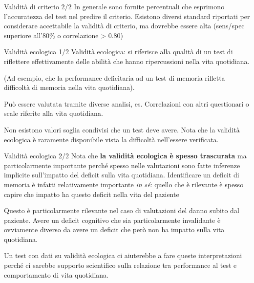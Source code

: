 \documentclass[
  ignorenonframetext,
]{beamer}
\begin{document}
\begin{frame}{Validità di criterio 2/2}
\label{validituxe0-di-criterio-22}
In generale sono fornite percentuali che esprimono l'accuratezza del
test nel predire il criterio. Esistono diversi standard riportati per
considerare accettabile la validità di criterio, ma dovrebbe essere alta
(sens/spec superiore all'80\% o correlazione \textgreater{} 0.80)
\end{frame}

\begin{frame}{Validità ecologica 1/2}
\label{validituxe0-ecologica-12}
Validità ecologica: si riferisce alla qualità di un test di riflettere
effettivamente delle abilità che hanno ripercussioni nella vita
quotidiana.

(Ad esempio, che la performance deficitaria ad un test di memoria
rifletta difficoltà di memoria nella vita quotidiana).

Può essere valutata tramite diverse analisi, es. Correlazioni con altri
questionari o scale riferite alla vita quotidiana.

Non esistono valori soglia condivisi che un test deve avere. Nota che la
validità ecologica è raramente disponibile vista la difficoltà
nell'essere verificata.
\end{frame}

\begin{frame}{Validità ecologica 2/2}
\label{validituxe0-ecologica-22}
Nota che \textbf{la validità ecologica è spesso trascurata} ma
particolarmente importante perché spesso nelle valutazioni sono fatte
inferenze implicite sull'impatto del deficit sulla vita quotidiana.
Identificare un deficit di memoria è infatti relativamente importante
\emph{in sé}: quello che è rilevante è spesso capire che impatto ha
questo deficit nella vita del paziente

Questo è particolarmente rilevante nel caso di valutazioni del danno
subito dal paziente. Avere un deficit cognitivo che sia particolarmente
invalidante è ovviamente diverso da avere un deficit che però non ha
impatto sulla vita quotidiana.

Un test con dati su validità ecologica ci aiuterebbe a fare queste
interpretazioni perché ci sarebbe supporto scientifico sulla relazione
tra performance al test e comportamento di vita quotidiana.
\end{frame}
\end{document}
